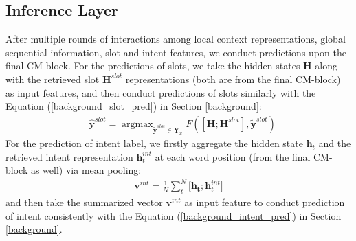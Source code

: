 \documentclass[11pt,a4paper]{article}
\begin{document}
\subsection{Inference Layer}
After multiple rounds of interactions among local context representations, global sequential information, slot and intent features, we conduct predictions upon the final CM-block.
For the predictions of slots, we take the hidden states $\mathbf{H}$ along with the retrieved slot $\mathbf{H}^{slot}$ representations (both are from the final CM-block) as input features, and then conduct predictions of slots similarly with the Equation (\ref{background_slot_pred}) in Section \ref{background}:
\begin{equation}
    \begin{split}
        & \hat{\mathbf{y}}^{slot} = \mathop{\arg\max} _ {\widetilde{\mathbf{y}}^{slot} \in \mathbf{Y}_x } F ([\mathbf{H}; \mathbf{H}^{slot}], \widetilde{\mathbf{y}}^{slot} )
    \end{split}
    \label{slot_pred}
\end{equation}
For the prediction of intent label, we firstly aggregate the hidden state $\mathbf{h}_t$ and the retrieved intent representation $\mathbf{h}_t^{int}$ at each word position (from the final CM-block as well) via mean pooling:
\begin{equation}
    \begin{split}
        \mathbf{v}^{int} = \frac{1}{N} \sum\limits_{t}^{N}{[ \mathbf{h_t}};\mathbf{h}_t^{int}]
    \end{split}
    \label{intent_concat}
\end{equation}
and then take the summarized vector $\mathbf{v}^{int}$ as input feature to conduct prediction of intent consistently with the Equation (\ref{background_intent_pred}) in Section \ref{background}.

\begin{table}[t!]
\begin{center}
\end{center} \vspace{-5pt}
\caption{Dataset statistics.} \vspace{-5pt}
\label{data_statistics}
\end{table}
\end{document}
